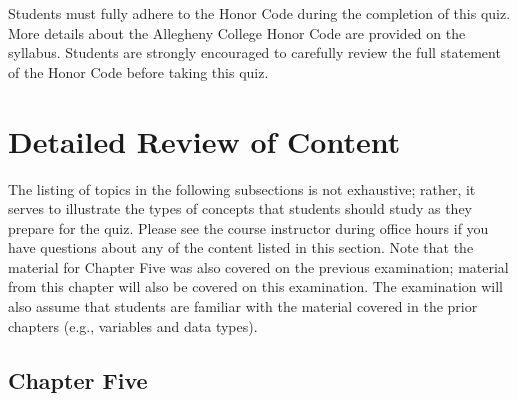 \documentclass[11pt]{article}
\begin{document}
Students must fully adhere to the Honor Code during the completion of this quiz.
More details about the Allegheny College Honor Code are provided on the
syllabus. Students are strongly encouraged to carefully review the full
statement of the Honor Code before taking this quiz.




\section*{Detailed Review of Content}

The listing of topics in the following subsections is not exhaustive; rather, it serves to illustrate the types of
concepts that students should study as they prepare for the quiz. Please see the course instructor during office hours
if you have questions about any of the content listed in this section. Note that the material for Chapter Five was also
covered on the previous examination; material from this chapter will also be covered on this examination. The
examination will also assume that students are familiar with the material covered in the prior chapters (e.g., variables
and data types).

\subsection*{Chapter Five}
\end{document}
